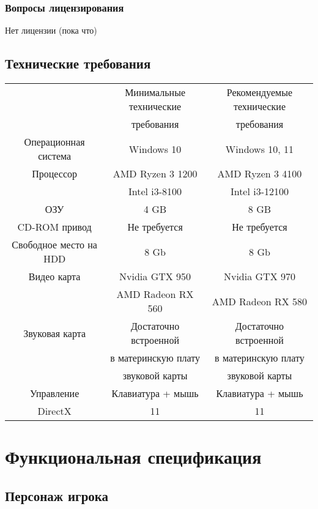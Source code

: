 \documentclass{article}
\begin{document}
\subsubsection{Вопросы лицензирования}

Нет лицензии (пока что)

\subsection{Технические требования}
\begin{center}
\begin{tabular}{ c | c | c }
 & Минимальные технические & Рекомендуемые технические \\ 
 & требования & требования \\ [2ex]
 Операционная система & Windows 10 & Windows 10, 11 \\ [2ex] 
 Процессор & AMD Ryzen 3 1200 & AMD Ryzen 3 4100 \\  
 & Intel i3-8100 & Intel i3-12100 \\ [2ex]
 ОЗУ & 4 GB & 8 GB \\ [2ex]
 CD-ROM привод & Не требуется & Не требуется \\ [2ex]
 Свободное место на HDD & 8 Gb & 8 Gb \\ [2ex]
 Видео карта & Nvidia GTX 950 & Nvidia GTX 970 \\
 & AMD Radeon RX 560 & AMD Radeon RX 580 \\ [2ex]
 Звуковая карта & Достаточно встроенной & Достаточно встроенной \\
 & в материнскую плату & в материнскую плату \\
 & звуковой карты & звуковой карты \\ [2ex]
 Управление & Клавиатура + мышь & Клавиатура + мышь \\ [2ex]
 DirectX & 11 & 11 \\
\end{tabular}
\end{center}

\section{Функциональная спецификация}

\subsection{Персонаж игрока}
\end{document}

